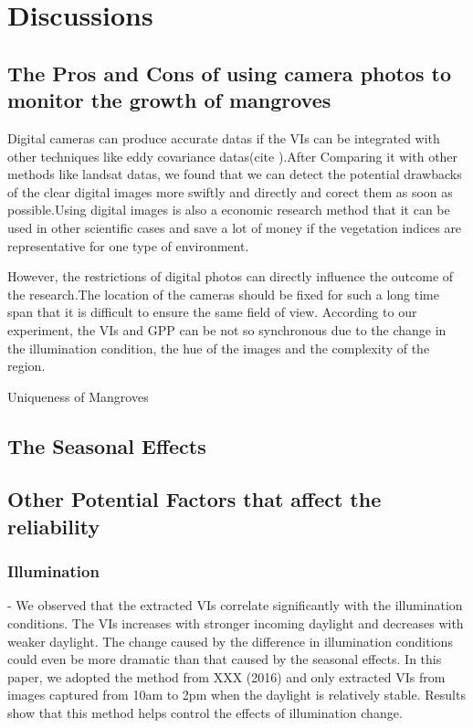 \documentclass{article}
\begin{document}
\section{Discussions} 
\subsection{The Pros and Cons of using camera photos to monitor the growth of mangroves}
Digital cameras can produce accurate datas if the VIs can be integrated with other techniques like eddy covariance datas(cite   ).After Comparing it with other methods like landsat datas, we found that we can detect the potential drawbacks of the clear digital images more swiftly and directly and corect them as soon as possible.Using digital images is also a economic research method that it can be used in other scientific cases and save a lot of money if the vegetation indices are representative for one type of environment.

However, the restrictions of digital photos can directly influence the outcome of the research.The location of the cameras should be fixed for such a long time span that it is difficult to ensure the same field of view.
According to our experiment, the VIs and GPP can be not so synchronous due to the change in the illumination condition, the hue of the images and the complexity of the region. 



Uniqueness of Mangroves 

\subsection{The Seasonal Effects}



\subsection{Other Potential Factors that affect the reliability}
\subsubsection{Illumination}
- We observed that the extracted VIs correlate significantly with the illumination conditions. The VIs increases with stronger incoming daylight and decreases with weaker daylight. The change caused by the difference in illumination conditions could even be more dramatic than that caused by the seasonal effects. In this paper, we adopted the method from XXX (2016) and only extracted VIs from images captured from 10am to 2pm when the daylight is relatively stable. Results show that this method helps control the effects of illumination change. 
\end{document}
